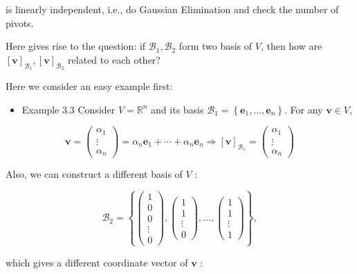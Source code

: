 \documentclass[11pt]{article}
\begin{document}
is linearly independent, i.e., do Gaussian Elimination and check the number of pivots.

Here gives rise to the question: if \({\mathcal{B}}_1,{\mathcal{B}}_2\) form two basis of \(V\), then how are \({\left\lbrack  \mathbf{v}\right\rbrack  }_{{\mathcal{B}}_1},{\left\lbrack  \mathbf{v}\right\rbrack  }_{{\mathcal{B}}_2}\) related to each other?

Here we consider an easy example first:

\begin{itemize}
\item Example 3.3 Consider \(V = {\mathbb{R}}^n\) and its basis \({\mathcal{B}}_1 = \left\{  {{\mathbf{e}}_1,\ldots ,{\mathbf{e}}_n}\right\}\). For any \(\mathbf{v} \in  V\),
\end{itemize}

\[
\mathbf{v} = \left( \begin{matrix} \alpha_1 \\  \vdots \\  \alpha_n \end{matrix}\right)  = \alpha_n{\mathbf{e}}_1 + \cdots  + \alpha_n{\mathbf{e}}_n \Rightarrow  {\left\lbrack  \mathbf{v}\right\rbrack  }_{{\mathcal{B}}_1} = \left( \begin{matrix} \alpha_1 \\  \vdots \\  \alpha_n \end{matrix}\right)
\]

Also, we can construct a different basis of \(V\) :

\[
{\mathcal{B}}_2 = \left\{  {\left( \begin{matrix} 1 \\  0 \\  0 \\  \vdots \\  0 \end{matrix}\right) ,\left( \begin{matrix} 1 \\  1 \\  \vdots \\  0 \end{matrix}\right) ,\ldots ,\left( \begin{matrix} 1 \\  1 \\  \vdots \\  1 \end{matrix}\right) }\right\}  ,
\]

which gives a different coordinate vector of \(\mathbf{v}\) :
\end{document}
